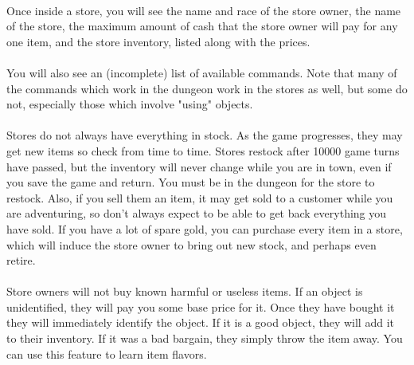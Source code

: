 \paragraph{}Once inside a store, you will see the name and race of the store owner, the
name of the store, the maximum amount of cash that the store owner will pay
for any one item, and the store inventory, listed along with the prices.

\paragraph{}You will also see an (incomplete) list of available commands. Note that
many of the commands which work in the dungeon work in the stores as well,
but some do not, especially those which involve "using" objects.

\paragraph{}Stores do not always have everything in stock. As the game progresses,
they may get new items so check from time to time. Stores restock after
10000 game turns have passed, but the inventory will never change while
you are in town, even if you save the game and return. You must be in the
dungeon for the store to restock. Also, if you sell them an item, it may
get sold to a customer while you are adventuring, so don't always expect
to be able to get back everything you have sold. If you have
a lot of spare gold, you can purchase every item in a store, which will
induce the store owner to bring out new stock, and perhaps even retire.

\paragraph{}Store owners will not buy known harmful or useless items. If
an object is unidentified, they will pay you some base price for it.
Once they have bought it they will immediately identify the object. If
it is a good object, they will add it to their inventory. If it was a
bad bargain, they simply throw the item away. You can use this feature
to learn item flavors.
